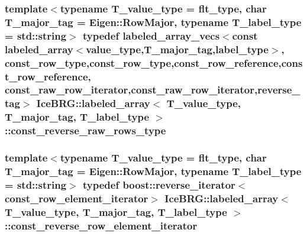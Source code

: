 \subsubsection[{const\+\_\+reverse\+\_\+raw\+\_\+rows\+\_\+type}]{\setlength{\rightskip}{0pt plus 5cm}template$<$typename T\+\_\+value\+\_\+type = flt\+\_\+type, char T\+\_\+major\+\_\+tag = Eigen\+::\+Row\+Major, typename T\+\_\+label\+\_\+type = std\+::string$>$ typedef {\bf labeled\+\_\+array\+\_\+vecs}$<$const {\bf labeled\+\_\+array}$<${\bf value\+\_\+type},T\+\_\+major\+\_\+tag,{\bf label\+\_\+type}$>$, {\bf const\+\_\+row\+\_\+type},{\bf const\+\_\+row\+\_\+type},{\bf const\+\_\+row\+\_\+reference},{\bf const\+\_\+row\+\_\+reference}, {\bf const\+\_\+raw\+\_\+row\+\_\+iterator},{\bf const\+\_\+raw\+\_\+row\+\_\+iterator},{\bf reverse\+\_\+tag}$>$ {\bf Ice\+B\+R\+G\+::labeled\+\_\+array}$<$ T\+\_\+value\+\_\+type, T\+\_\+major\+\_\+tag, T\+\_\+label\+\_\+type $>$\+::{\bf const\+\_\+reverse\+\_\+raw\+\_\+rows\+\_\+type}}\label{classIceBRG_1_1labeled__array_a83872d8babf4f2e0db65776cac90aa38}
\hypertarget{classIceBRG_1_1labeled__array_a585569389ad58ee93baab2bc1dc09a48}{}
\subsubsection[{const\+\_\+reverse\+\_\+row\+\_\+element\+\_\+iterator}]{\setlength{\rightskip}{0pt plus 5cm}template$<$typename T\+\_\+value\+\_\+type = flt\+\_\+type, char T\+\_\+major\+\_\+tag = Eigen\+::\+Row\+Major, typename T\+\_\+label\+\_\+type = std\+::string$>$ typedef boost\+::reverse\+\_\+iterator$<${\bf const\+\_\+row\+\_\+element\+\_\+iterator}$>$ {\bf Ice\+B\+R\+G\+::labeled\+\_\+array}$<$ T\+\_\+value\+\_\+type, T\+\_\+major\+\_\+tag, T\+\_\+label\+\_\+type $>$\+::{\bf const\+\_\+reverse\+\_\+row\+\_\+element\+\_\+iterator}}\label{classIceBRG_1_1labeled__array_a585569389ad58ee93baab2bc1dc09a48}
\hypertarget{classIceBRG_1_1labeled__array_a5f03fa967c469ac1a6d16f7eccf48943}{}
